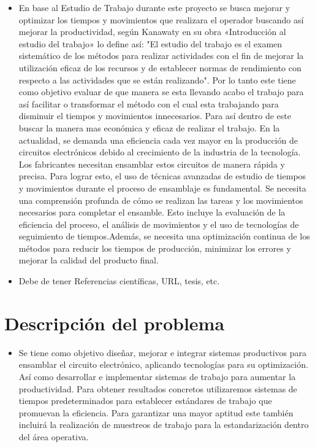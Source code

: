     \begin{itemize}
        \item En base al Estudio de Trabajo durante este proyecto se busca mejorar y optimizar los tiempos y movimientos que realizara el operador buscando así mejorar la productividad, según Kanawaty en su obra «Introducción al estudio del trabajo» lo define así: "El estudio del trabajo es el examen sistemático de los métodos para realizar actividades con el fin de mejorar la utilización eficaz de los recursos y de establecer normas de rendimiento con respecto a las actividades que se están realizando". Por lo tanto este tiene como objetivo evaluar de que manera se esta llevando acabo el trabajo para así facilitar o transformar el método con el cual esta trabajando para disminuir el tiempos y movimientos innecesarios. Para así dentro de este buscar la manera mas económica y eficaz de realizar el trabajo.
        En la actualidad, se demanda una eficiencia cada vez mayor en la producción de circuitos electrónicos debido al crecimiento de la industria de la tecnología. Los fabricantes necesitan ensamblar estos circuitos de manera rápida y precisa.
        Para lograr esto, el uso de técnicas avanzadas de estudio de tiempos y movimientos durante el proceso de ensamblaje es fundamental. Se necesita una comprensión profunda de cómo se realizan las tareas y los movimientos necesarios para completar el ensamble. Esto incluye la evaluación de la eficiencia del proceso, el análisis de movimientos y el uso de tecnologías de seguimiento de tiempos.Además, se necesita una optimización continua de los métodos para reducir los tiempos de producción, minimizar los errores y mejorar la calidad del producto final.
        \item Debe de tener Referencias científicas, URL, tesis, etc.
    \end{itemize}
    \section{Descripción del problema}
    \begin{itemize}
        \item Se tiene como objetivo diseñar, mejorar e integrar sistemas productivos para ensamblar el circuito electrónico, aplicando tecnologías para su optimización. Así como desarrollar e implementar sistemas de trabajo para aumentar la productividad. Para obtener resultados concretos utilizaremos sistemas de tiempos predeterminados para establecer estándares de trabajo que promuevan la eficiencia. Para garantizar una mayor aptitud este también incluirá la realización de muestreos de trabajo para la estandarización dentro del área operativa. 
    \end{itemize}
    
